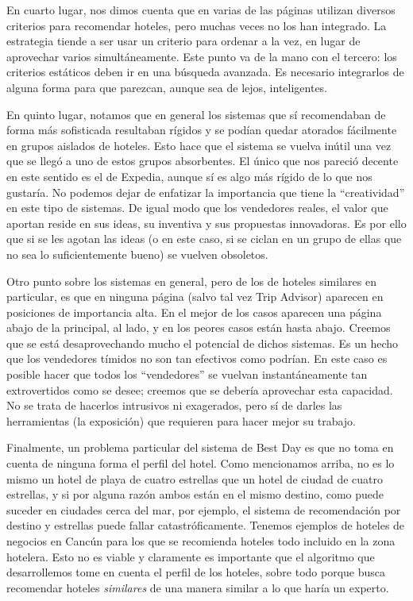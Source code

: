 \documentclass[12pt]{report}
\begin{document}
En cuarto lugar, nos dimos cuenta que en varias de las páginas utilizan diversos criterios para recomendar hoteles, pero muchas veces no los han integrado. La estrategia tiende a ser usar un criterio para ordenar a la vez, en lugar de aprovechar varios simultáneamente. Este punto va de la mano con el tercero: los criterios estáticos deben ir en una búsqueda avanzada. Es necesario integrarlos de alguna forma para que parezcan, aunque sea de lejos, inteligentes.

En quinto lugar, notamos que en general los sistemas que sí recomendaban de forma más sofisticada resultaban rígidos y se podían quedar atorados fácilmente en grupos aislados de hoteles. Esto hace que el sistema se vuelva inútil una vez que se llegó a uno de estos grupos absorbentes. El único que nos pareció decente en este sentido es el de Expedia, aunque sí es algo más rígido de lo que nos gustaría. No podemos dejar de enfatizar la importancia que tiene la ``creatividad'' en este tipo de sistemas. De igual modo que los vendedores reales, el valor que aportan reside en sus ideas, su inventiva y sus propuestas innovadoras. Es por ello que si se les agotan las ideas (o en este caso, si se ciclan en un grupo de ellas que no sea lo suficientemente bueno) se vuelven obsoletos.

Otro punto sobre los sistemas en general, pero de los de hoteles similares en particular, es que en ninguna página (salvo tal vez Trip Advisor) aparecen en posiciones de importancia alta. En el mejor de los casos aparecen una página abajo de la principal, al lado, y en los peores casos están hasta abajo. Creemos que se está desaprovechando mucho el potencial de dichos sistemas. Es un hecho que los vendedores tímidos no son tan efectivos como podrían. En este caso es posible hacer que todos los ``vendedores'' se vuelvan instantáneamente tan extrovertidos como se desee; creemos que se debería aprovechar esta capacidad. No se trata de hacerlos intrusivos ni exagerados, pero sí de darles las herramientas (la exposición) que requieren para hacer mejor su trabajo.

Finalmente, un problema particular del sistema de Best Day es que no toma en cuenta de ninguna forma el perfil del hotel. Como mencionamos arriba, no es lo mismo un hotel de playa de cuatro estrellas que un hotel de ciudad de cuatro estrellas, y si por alguna razón ambos están en el mismo destino, como puede suceder en ciudades cerca del mar, por ejemplo, el sistema de recomendación por destino y estrellas puede fallar catastróficamente. Tenemos ejemplos de hoteles de negocios en Cancún para los que se recomienda hoteles todo incluido en la zona hotelera. Esto no es viable y claramente es importante que el algoritmo que desarrollemos tome en cuenta el perfil de los hoteles, sobre todo porque busca recomendar hoteles \emph{similares} de una manera similar a lo que haría un experto.
\end{document}
